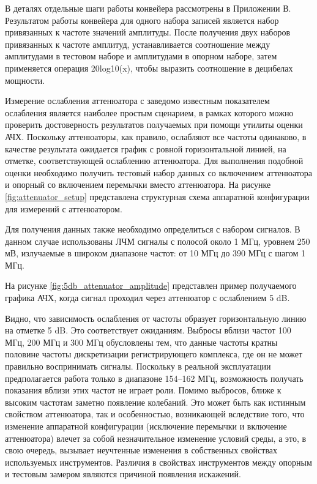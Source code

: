 \documentclass{report}
\begin{document}
В деталях отдельные шаги работы конвейера рассмотрены в Приложении В. Результатом работы конвейера для одного набора записей является набор привязанных к частоте значений амплитуды. После получения двух наборов привязанных к частоте амплитуд, устанавливается соотношение между амплитудами в тестовом наборе и амплитудами в опорном наборе, затем применяется операция 20log10(x), чтобы выразить соотношение в децибелах мощности.

Измерение ослабления аттенюатора с заведомо известным показателем ослабления является наиболее простым сценарием, в рамках которого можно проверить достоверность результатов получаемых при помощи утилиты оценки АЧХ. Поскольку аттенюаторы, как правило, ослабляют все частоты одинаково, в качестве результата ожидается график с ровной горизонтальной линией, на отметке, соответствующей ослаблению аттенюатора. Для выполнения подобной оценки необходимо получить тестовый набор данных со включением аттенюатора и опорный со включением перемычки вместо аттенюатора. На рисунке \ref{fig:attenuator_setup} представлена структурная схема аппаратной конфигурации для измерений с аттенюатором.


Для получения данных также необходимо определиться с набором сигналов. В данном случае использованы ЛЧМ сигналы с полосой около 1 МГц, уровнем 250 мВ, излучаемые в широком диапазоне частот: от 10 МГц до 390 МГц с шагом 1 МГц.

На рисунке \ref{fig:5db_attenuator_amplitude} представлен пример получаемого графика АЧХ, когда сигнал проходил через аттенюатор с ослаблением 5 dB.


Видно, что зависимость ослабления от частоты образует горизонтальную линию на отметке 5 dB. Это соответствует ожиданиям. Выбросы вблизи частот 100 МГц, 200 МГц и 300 МГц обусловлены тем, что данные частоты кратны половине частоты дискретизации регистрирующего комплекса, где он не может правильно воспринимать сигналы. Поскольку в реальной эксплуатации предполагается работа только в диапазоне 154--162 МГц, возможность получать показания вблизи этих частот не играет роли. Помимо выбросов, ближе к высоким частотам заметно появление колебаний. Это может быть как истинным свойством аттенюатора, так и особенностью, возникающей вследствие того, что изменение аппаратной конфигурации (исключение перемычки и включение аттенюатора) влечет за собой незначительное изменение условий среды, а это, в свою очередь, вызывает неучтенные изменения в собственных свойствах используемых инструментов. Различия в свойствах инструментов между опорным и тестовым замером являются причиной появления искажений.
\end{document}
